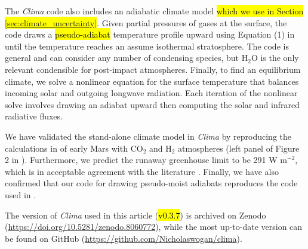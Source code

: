 The \emph{Clima} code also includes an adiabatic climate model \hl{which we use in Section \mbox{\ref{sec:climate_uncertainty}}}. Given partial pressures of gases at the surface, the code draws a \hl{pseudo-adiabat} temperature profile upward using Equation (1) in \citet{Graham_2021} until the temperature reaches an assume isothermal stratosphere. The code is general and can consider any number of condensing species, but H$_2$O is the only relevant condensible for post-impact atmospheres. Finally, to find an equilibrium climate, we solve a nonlinear equation for the surface temperature that balances incoming solar and outgoing longwave radiation. Each iteration of the nonlinear solve involves drawing an adiabat upward then computing the solar and infrared radiative fluxes.

We have validated the stand-alone climate model in \emph{Clima} by reproducing the calculations in \citet{Wordsworth_2017} of early Mars with CO$_2$ and H$_2$ atmospheres (left panel of Figure 2 in \citet{Wordsworth_2017}). Furthermore, we predict the runaway greenhouse limit to be 291 W m$^{-2}$, which is in acceptable agreement with the literature \citep[e.g.,][]{Kopparapu_2013}. Finally, we have also confirmed that our code for drawing pseudo-moist adiabats reproduces the code used in \citet{Graham_2021}.

The version of \emph{Clima} used in this article (\hl{v0.3.7}) is archived on Zenodo (\url{https://doi.org/10.5281/zenodo.8060772}), while the most up-to-date version can be found on GitHub (\url{https://github.com/Nicholaswogan/clima}).

